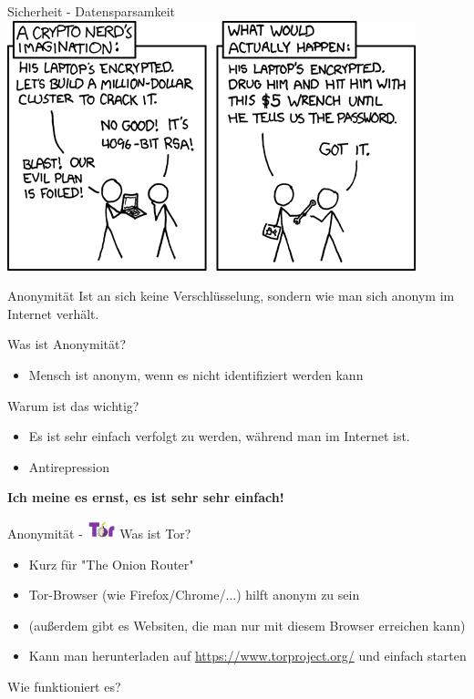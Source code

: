 \documentclass{beamer}
\begin{document}
\begin{frame}{Sicherheit - Datensparsamkeit}
    \centering\includegraphics[height=0.7\textheight]{opsec_xkcd.png}
\end{frame}

\begin{frame}{Anonymität}
	Ist an sich keine Verschlüsselung, sondern wie man sich anonym im Internet verhält.
	\\\hspace{1cm}
	
	Was ist Anonymität?
	\begin{itemize}
		\item Mensch ist anonym, wenn es nicht identifiziert werden kann
	\end{itemize}
	
	Warum ist das wichtig?
	\begin{itemize}
		\item Es ist sehr einfach verfolgt zu werden, während man im Internet ist. 
		\item Antirepression
	\end{itemize}
	
	\textbf{Ich meine es ernst, es ist sehr sehr einfach!}
\end{frame}

\begin{frame}{Anonymität - \includegraphics[align=c,height=1.5em]{tor.jpg}}
	Was ist Tor?
	\begin{itemize}
		\item Kurz für "The Onion Router"
		\item Tor-Browser (wie Firefox/Chrome/...) hilft anonym zu sein
		\item (außerdem gibt es Websiten, die man nur mit diesem Browser erreichen kann)
		\item Kann man herunterladen auf \url{https://www.torproject.org/} und einfach starten
	\end{itemize}
	\hspace{1cm}
	
	Wie funktioniert es?
\end{frame}
\end{document}
